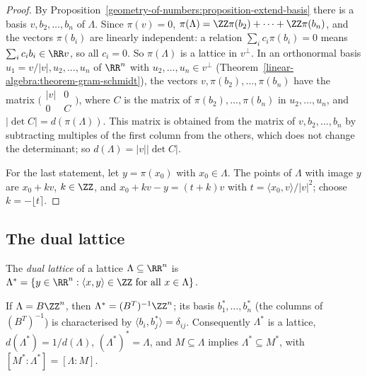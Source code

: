 \begin{proof}
By Proposition~\ref{geometry-of-numbers:proposition-extend-basis} there is a basis $v, b_2, \ldots, b_n$ of $\Lambda$. Since $\pi(v) = 0$, $\pi(\Lambda) = \ZZ\pi(b_2) + \cdots + \ZZ\pi(b_n)$, and the
vectors $\pi(b_i)$ are linearly independent: a relation $\sum_ic_i\pi(b_i) = 0$ means $\sum_ic_ib_i \in \RR v$, so all $c_i = 0$. So $\pi(\Lambda)$ is a lattice in $v^\perp$. In an orthonormal basis
$u_1 = v/|v|, u_2, \ldots, u_n$ of $\RR^n$ with $u_2, \ldots, u_n \in v^\perp$ (Theorem~\ref{linear-algebra:theorem-gram-schmidt}), the vectors $v, \pi(b_2), \ldots, \pi(b_n)$ have the matrix
$\bigl(\begin{smallmatrix}|v| & 0\\ 0 & C\end{smallmatrix}\bigr)$, where $C$ is the matrix of $\pi(b_2), \ldots, \pi(b_n)$ in $u_2, \ldots, u_n$, and $|\det C| = d(\pi(\Lambda))$. This matrix is obtained from
the matrix of $v, b_2, \ldots, b_n$ by subtracting multiples of the first column from the others, which does not change the determinant; so $d(\Lambda) = |v||\det C|$.

For the last statement, let $y = \pi(x_0)$ with $x_0 \in \Lambda$. The points of $\Lambda$ with image $y$ are $x_0 + kv$, $k \in \ZZ$, and $x_0 + kv - y = (t + k)v$ with $t = \langle x_0, v \rangle/|v|^2$;
choose $k = -\lfloor t \rceil$.
\end{proof}

\subsection{The dual lattice}\label{geometry-of-numbers:subsection-dual}

\begin{definition}\label{geometry-of-numbers:definition-dual}
The \emph{dual lattice} of a lattice $\Lambda \subseteq \RR^n$ is $\Lambda^* = \{y \in \RR^n : \langle x, y \rangle \in \ZZ \text{ for all } x \in \Lambda\}$.
\end{definition}

\begin{proposition}\label{geometry-of-numbers:proposition-dual}
If $\Lambda = B\ZZ^n$, then $\Lambda^* = (B^T)^{-1}\ZZ^n$; its basis $b_1^*, \ldots, b_n^*$ (the columns of $(B^T)^{-1}$) is characterised by $\langle b_i, b_j^* \rangle = \delta_{ij}$. Consequently
$\Lambda^*$ is a lattice, $d(\Lambda^*) = 1/d(\Lambda)$, $(\Lambda^*)^* = \Lambda$, and $M \subseteq \Lambda$ implies $\Lambda^* \subseteq M^*$, with $[M^* : \Lambda^*] = [\Lambda : M]$.
\end{proposition}

